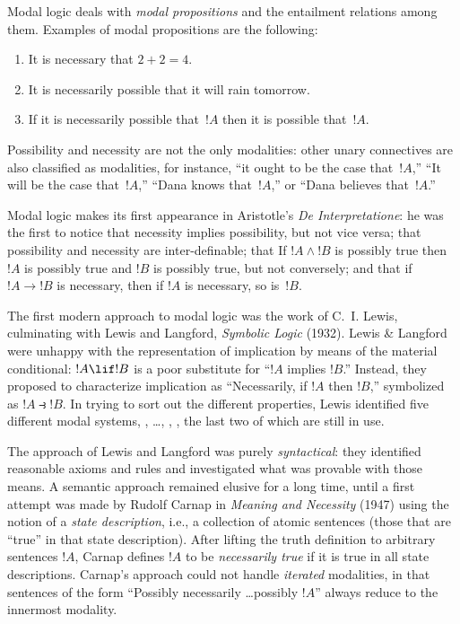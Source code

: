 \documentclass[../../../include/open-logic-section]{subfiles}
\begin{document}


Modal logic deals with \emph{modal propositions} and the entailment
relations among them. Examples of modal propositions are the
following:
\begin{enumerate}
\item It is necessary that $2+2=4$.
\item It is necessarily possible that it will rain tomorrow.
\item If it is necessarily possible that~$!A$ then it is possible
  that~$!A$.
\end{enumerate}
Possibility and necessity are not the only modalities: other unary
connectives are also classified as modalities, for instance, ``it
ought to be the case that~$!A$,'' ``It will be the case that~$!A$,''
``Dana knows that~$!A$,'' or ``Dana believes that~$!A$.''

Modal logic makes its first appearance in Aristotle's \emph{De
  Interpretatione}: he was the first to notice that necessity implies
possibility, but not vice versa; that possibility and necessity are
inter-definable; that If $!A \land !B$ is possibly true then
$!A$ is possibly true and $!B$ is possibly true, but not
conversely; and that if $!A \to !B$ is necessary, then if
$!A$ is necessary, so is~$!B$.

The first modern approach to modal logic was the work of C.~I. Lewis,
culminating with Lewis and Langford, \emph{Symbolic Logic}
(1932). Lewis \& Langford were unhappy with the representation of
implication by means of the material conditional: $!A \lif !B$
is a poor substitute for ``$!A$ implies $!B$.'' Instead, they
proposed to characterize implication as ``Necessarily, if $!A$
then $!B$,'' symbolized as $!A \strictif !B$. In trying to
sort out the different properties, Lewis identified five different
modal systems, , \ldots, , , the last
two of which are still in use.

The approach of Lewis and Langford was purely \emph{syntactical}: they
identified reasonable axioms and rules and investigated what was
provable with those means. A semantic approach remained elusive for a
long time, until a first attempt was made by Rudolf Carnap in
\emph{Meaning and Necessity} (1947) using the notion of a \emph{state
  description}, i.e., a collection of atomic sentences (those that are
``true'' in that state description). After lifting the truth
definition to arbitrary sentences $!A$, Carnap defines $!A$
to be \emph{necessarily true} if it is true in all state
descriptions. Carnap's approach could not handle \emph{iterated}
modalities, in that sentences of the form ``Possibly necessarily
\ldots possibly $!A$'' always reduce to the innermost modality.
\end{document}
